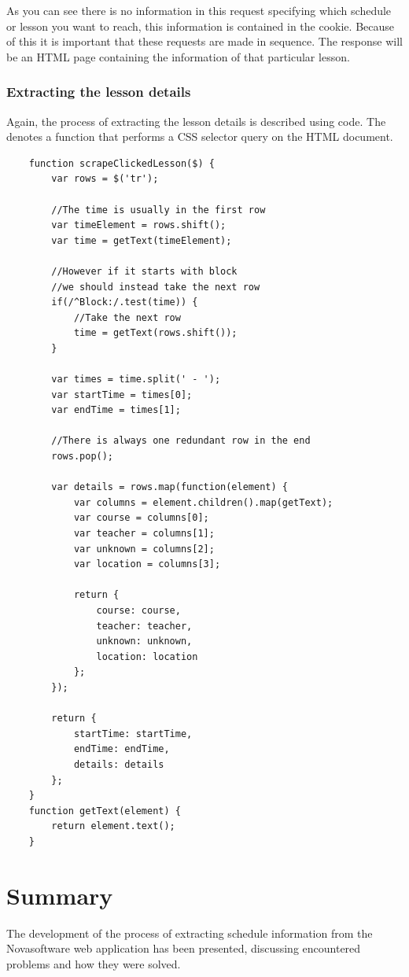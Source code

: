 \documentclass{article}
\begin{document}
	As you can see there is no information in this request specifying which schedule or lesson you want to reach, this information is contained in the cookie. Because of this it is important that these requests are made in sequence. The response will be an HTML page containing the information of that particular lesson.
	
	\subsubsection{Extracting the lesson details}
	
	Again, the process of extracting the lesson details is described using code. The \texttt{\textdollar} denotes a function that performs a CSS selector query on the HTML document.
	
	\medskip
	\begin{lstlisting}
	function scrapeClickedLesson($) {
		var rows = $('tr');
		
		//The time is usually in the first row
		var timeElement = rows.shift();
		var time = getText(timeElement);
		
		//However if it starts with block
		//we should instead take the next row
		if(/^Block:/.test(time)) {
			//Take the next row
			time = getText(rows.shift());
		}
		
		var times = time.split(' - ');
		var startTime = times[0];
		var endTime = times[1];
		
		//There is always one redundant row in the end
		rows.pop();
		
		var details = rows.map(function(element) {
			var columns = element.children().map(getText);
			var course = columns[0];
			var teacher = columns[1];
			var unknown = columns[2];
			var location = columns[3];
			
			return {
				course: course,
				teacher: teacher,
				unknown: unknown,
				location: location
			};
		});
		
		return {
			startTime: startTime,
			endTime: endTime,
			details: details
		};
	}
	function getText(element) {
		return element.text();
	}
	\end{lstlisting}
	
	\section{Summary}
	The development of the process of extracting schedule information from the Novasoftware web application has been presented, discussing encountered problems and how they were solved.
	
\end{document}
